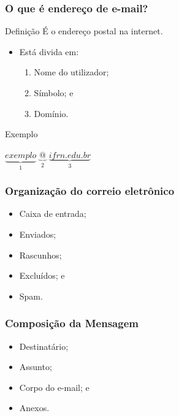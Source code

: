 \documentclass[aspectratio=169]{beamer} %
\begin{document}
\begin{frame}
	\frametitle{O que é endere\c co de e-mail?}
	
	\begin{block}{Defini\c cão}
		É o endere\c co postal na internet.
	\end{block} \vfill
	
	\begin{itemize}
		\item Está divida em: 
		\begin{enumerate}
			\item Nome do utilizador; 
			\item Símbolo;  e
			\item Domínio. 
		\end{enumerate}				
	\end{itemize} \vfill
	
	\begin{exampleblock}{Exemplo}
		\begin{center}
			$\underbrace{exemplo}_{1}$ $\underbrace{@}_{2}$ $\underbrace{ifrn.edu.br}_{3}$
		\end{center}
	\end{exampleblock}
\end{frame}

\begin{frame}
	\frametitle{Organiza\c cão do correio eletrônico}
	
	\begin{itemize}
		\item Caixa de entrada;
		\item Enviados;
		\item Rascunhos;
		\item Excluídos; e
		\item Spam.
	\end{itemize}
\end{frame}

\begin{frame}
	\frametitle{Composi\c cão da Mensagem}
	
	\begin{itemize}
		\item Destinatário;
		\item Assunto;
		\item Corpo do e-mail; e
		\item Anexos.
	\end{itemize}
\end{frame}
\end{document}
